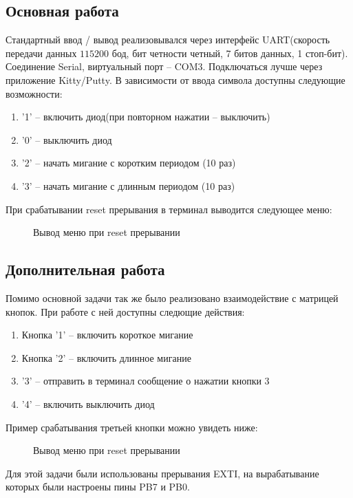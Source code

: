 \subsection{Основная работа}
Стандартный ввод / вывод реализовывался через интерфейс UART(скорость передачи данных $115200$ бод, бит четности четный,
7 битов данных, 1 стоп-бит). Соединение Serial, виртуальный порт -- COM3. Подключаться лучше через приложение Kitty/Putty.
В зависимости от ввода символа доступны следующие возможности:
\begin{enumerate}
\item '1' -- включить диод(при повторном нажатии -- выключить)
\item '0' -- выключить диод
\item '2' -- начать мигание с коротким периодом (10 раз)
\item '3' -- начать мигание с длинным периодом (10 раз)
\end{enumerate}

При срабатывании reset прерывания в терминал выводится следующее меню:
\begin{figure}[H]
    \centering
        \caption{Вывод меню при reset прерывании}
\end{figure}

\subsection{Дополнительная работа}
Помимо основной задачи так же было реализовано взаимодействие с матрицей кнопок. При работе с ней доступны следющие действия:
\begin{enumerate}
    \item Кнопка '1' -- включить короткое мигание
    \item Кнопка '2' -- включить длинное мигание
    \item '3' -- отправить в терминал сообщение о нажатии кнопки 3
    \item '4' -- включить выключить диод
\end{enumerate}
Пример срабатывания третьей кнопки можно увидеть ниже:
\begin{figure}[H]
    \centering
        \caption{Вывод меню при reset прерывании}
\end{figure}


Для этой задачи были использованы прерывания EXTI, на вырабатывание которых были настроены пины PB7 и PB0. 
\newpage


